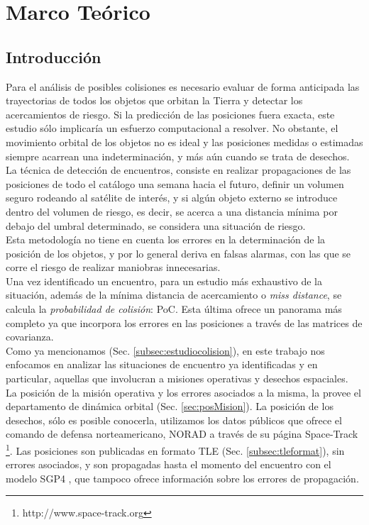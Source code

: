 \chapter{Marco Teórico}
\label{chap:marcoteorico}

\section{Introducci\'on}

Para el an\'alisis de posibles colisiones es necesario evaluar de forma anticipada las trayectorias de todos los objetos que orbitan la Tierra y detectar los acercamientos de riesgo. Si la predicci\'on de las posiciones fuera exacta, este estudio s\'olo implicar\'ia un esfuerzo computacional a resolver. No obstante, el movimiento orbital de los objetos no es ideal y las posiciones medidas o estimadas siempre acarrean una indeterminaci\'on, y m\'as a\'un cuando se trata de desechos.\\

La t\'ecnica de detecci\'on de encuentros, consiste en realizar propagaciones de las posiciones de todo el cat\'alogo una semana hacia el futuro, definir un volumen seguro rodeando al sat\'elite de inter\'es, y si alg\'un objeto externo se introduce dentro del volumen de riesgo, es decir, se acerca a una distancia m\'inima por debajo del umbral determinado, se considera una situaci\'on de riesgo.\\ Esta metodolog\'ia no tiene en cuenta los errores en la determinaci\'on de la posici\'on de los objetos, y por lo general deriva en falsas alarmas, con las que se corre el riesgo de realizar maniobras innecesarias.\\
Una vez identificado un encuentro, para un estudio m\'as exhaustivo de la situaci\'on, adem\'as de la m\'inima distancia de acercamiento o {\it{miss distance}}, se calcula la {\it{probabilidad de colisi\'on}}: PoC.  Esta \'ultima ofrece un panorama m\'as completo ya que incorpora los errores en las posiciones a trav\'es de las matrices de covarianza.\\

Como ya mencionamos (Sec. \ref{subsec:estudiocolision}), en este trabajo nos enfocamos en analizar las situaciones de encuentro ya identificadas y en particular, aquellas que involucran a misiones operativas y desechos espaciales.\\

La posici\'on de la misi\'on operativa y los errores asociados a la misma, la provee el departamento de din\'amica orbital (Sec. \ref{sec:posMision}).
La posici\'on de los desechos, s\'olo es posible conocerla, utilizamos los datos p\'ublicos que ofrece el comando de defensa norteamericano, \ac{NORAD} a trav\'es de su p\'agina Space-Track {\footnote{http://www.space-track.org}}. Las posiciones son publicadas en formato \ac{TLE} (Sec. \ref{subsec:tleformat}), sin errores asociados, y son propagadas hasta el momento del encuentro con el modelo SGP4  \citep{hoots1980models}, que tampoco ofrece informaci\'on sobre los errores de propagaci\'on.\\

